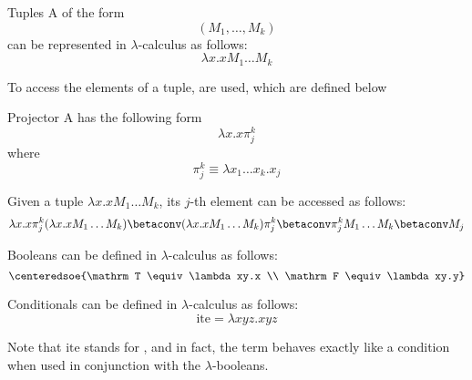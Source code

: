 \documentclass[a4paper, 12pt]{report}
\begin{document}
    \begin{frameddefn}{Tuples}
        A  of the form $$(M_1, \ldots, M_k)$$ can be represented in $\lambda$-calculus as follows: $$\lambda x.xM_1 \ldots M_k$$
    \end{frameddefn}

    To access the elements of a tuple,  are used, which are defined below

    \begin{frameddefn}{Projector}
        A  has the following form $$\lambda x.x\pi_j^k$$ where $$\pi_j^k \equiv \lambda x_1 \ldots x_k.x_j$$
    \end{frameddefn}

    \begin{example}[Projectors]
        Given a tuple $\lambda x.x M_1 \ldots M_k$, its $j$-th element can be accessed as follows: $$\lambda x.x \pi_j^k (\lambda x.x M_1 \ldots M_k) \betaconv (\lambda x.x M_1 \ldots M_k) \pi_j^k \betaconv \pi_j^k M_1 \ldots M_k \betaconv M_j$$
    \end{example}

    \begin{frameddefn}{Booleans}
         can be defined in $\lambda$-calculus as follows: $$\centeredsoe{\mathrm T \equiv \lambda xy.x \\ \mathrm F \equiv \lambda xy.y}$$
    \end{frameddefn}

    \begin{frameddefn}{Conditionals}
         can be defined in $\lambda$-calculus as follows: $$\mathrm{ite} = \lambda xyz.xyz$$
    \end{frameddefn}

    Note that $\mathrm{ite}$ stands for , and in fact, the term behaves exactly like a condition when used in conjunction with the $\lambda$-booleans.
\end{document}
